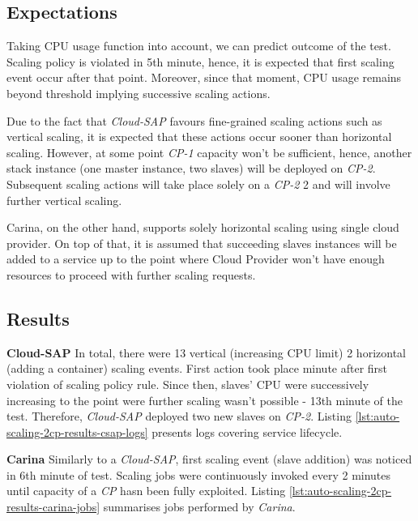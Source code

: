 \newpage
\subsection*{Expectations}
Taking CPU usage function into account, we can predict outcome of the test. Scaling policy is violated in 5th minute, hence, it is expected that first scaling event occur after that point. Moreover, since that moment, CPU usage remains beyond threshold implying successive scaling actions.

Due to the fact that \emph{Cloud-SAP} favours fine-grained scaling actions such as vertical scaling, it is expected that these actions occur sooner than horizontal scaling. However, at some point \emph{CP-1} capacity won't be sufficient, hence, another stack instance (one master instance, two slaves) will be deployed on \emph{CP-2}. Subsequent scaling actions will take place solely on a \emph{CP-2} 2 and will involve further vertical scaling.

Carina, on the other hand, supports solely horizontal scaling using single cloud provider. On top of that, it is assumed that succeeding slaves instances will be added to a service up to the point where Cloud Provider won't have enough resources to proceed with further scaling requests.

\subsection*{Results}

\begin{asparaenum}

  \item[\textbf{Cloud-SAP}] 
   In total, there were 13 vertical (increasing CPU limit) 2 horizontal (adding a container) scaling events. First action took place minute after first violation of scaling policy rule. Since then, slaves' CPU were successively increasing to the point were further scaling wasn't possible - 13th minute of the test. Therefore, \emph{Cloud-SAP} deployed two new slaves on \emph{CP-2}. Listing \ref{lst:auto-scaling-2cp-results-csap-logs} presents logs covering service lifecycle. 
  
  \item[\textbf{Carina}] 
  Similarly to a \emph{Cloud-SAP}, first scaling event (slave addition) was noticed in 6th minute of test. Scaling jobs were continuously invoked every 2 minutes until capacity of a \emph{CP} hasn been fully exploited. Listing \ref{lst:auto-scaling-2cp-results-carina-jobs} summarises jobs performed by \emph{Carina}. 
\end{asparaenum}
  

